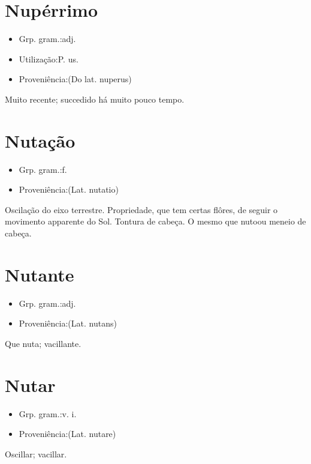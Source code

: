 \section{Nupérrimo}
\begin{itemize}
\item {Grp. gram.:adj.}
\end{itemize}
\begin{itemize}
\item {Utilização:P. us.}
\end{itemize}
\begin{itemize}
\item {Proveniência:(Do lat. \textunderscore nuperus\textunderscore )}
\end{itemize}
Muito recente; succedido há muito pouco tempo.
\section{Nutação}
\begin{itemize}
\item {Grp. gram.:f.}
\end{itemize}
\begin{itemize}
\item {Proveniência:(Lat. \textunderscore nutatio\textunderscore )}
\end{itemize}
Oscilação do eixo terrestre.
Propriedade, que tem certas flôres, de seguir o movimento apparente do Sol.
Tontura de cabeça.
O mesmo que \textunderscore nuto\textunderscore  ou meneio de cabeça.
\section{Nutante}
\begin{itemize}
\item {Grp. gram.:adj.}
\end{itemize}
\begin{itemize}
\item {Proveniência:(Lat. \textunderscore nutans\textunderscore )}
\end{itemize}
Que nuta; vacillante.
\section{Nutar}
\begin{itemize}
\item {Grp. gram.:v. i.}
\end{itemize}
\begin{itemize}
\item {Proveniência:(Lat. \textunderscore nutare\textunderscore )}
\end{itemize}
Oscillar; vacillar.
